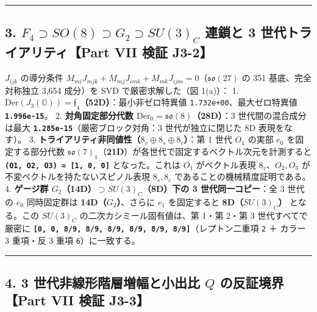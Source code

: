 \documentclass[
  a4paper,
]{ltjsarticle}
\begin{document}
\begin{center}\rule{0.5\linewidth}{0.5pt}\end{center}

\subsection{\texorpdfstring{3.
\(F_4 \supset SO(8) \supset G_2 \supset SU(3)_C\) 連鎖と 3
世代トライアリティ【Part VII 検証
J3-2】}{3. F\_4 \textbackslash supset SO(8) \textbackslash supset G\_2 \textbackslash supset SU(3)\_C 連鎖と 3 世代トライアリティ【Part VII 検証 J3-2】}}\label{f_4-supset-so8-supset-g_2-supset-su3_c-ux9023ux9396ux3068-3-ux4e16ux4ee3ux30c8ux30e9ux30a4ux30a2ux30eaux30c6ux30a3part-vii-ux691cux8a3c-j3-2}

\(J_{ijk}\) の導分条件
\(M_{mi} J_{mjk} + M_{mj} J_{imk} + M_{mk} J_{ijm} = 0\)（\(\mathfrak{so}(27)\)
の 351 基底、完全対称独立 3,654 成分）を SVD で厳密求解した（図 1(a)）：
1.
\textbf{\(\mathrm{Der}(J_3(\mathbb{O})) = \mathfrak{f}_4\)（52D）}：最小非ゼロ特異値
\texttt{1.732e+00}、最大ゼロ特異値 \textbf{\texttt{1.996e-15}}。 2.
\textbf{対角固定部分代数
\(\mathrm{Der}_0 = \mathfrak{so}(8)\)（28D）}：3 世代間の混合成分は最大
\textbf{\texttt{1.285e-15}}（厳密ブロック対角：3 世代が独立に閉じた 8D
表現をなす）。 3.
\textbf{トライアリティ非同値性（\(8_v \oplus 8_s \oplus 8_c\)）}：第 1
世代 \(O_1\) の実部 \(e_0\) を固定する部分代数
\(\mathfrak{so}(7)_1\)（\textbf{21D}）が各世代で固定するベクトル次元を計測すると
\textbf{\texttt{(O1,\ O2,\ O3)\ =\ {[}1,\ 0,\ 0{]}}} となった。これは
\(O_1\) がベクトル表現 \(8_v\)、\(O_2, O_3\)
が不変ベクトルを持たないスピノル表現 \(8_s, 8_c\)
であることの機械精度証明である。 4. \textbf{ゲージ群
\(G_2\)（14D）\(\supset SU(3)_C\)（8D）下の 3 世代同一コピー}：全 3
世代の \(e_0\) 同時固定群は \textbf{14D（\(G_2\)）}、さらに \(e_1\)
を固定すると \textbf{8D（\(SU(3)_C\)）} となる。この \(SU(3)_C\)
の二次カシミール固有値は、第 1・第 2・第 3 世代すべてで厳密に
\textbf{\texttt{{[}0,\ 0,\ 8/9,\ 8/9,\ 8/9,\ 8/9,\ 8/9,\ 8/9{]}}}（レプトン二重項
\texttt{2} ＋ カラー 3 重項・反 3 重項 \texttt{6}）に一致する。

\begin{center}\rule{0.5\linewidth}{0.5pt}\end{center}

\subsection{\texorpdfstring{4. 3 世代非線形階層増幅と小出比 \(Q\)
の反証境界【Part VII 検証
J3-3】}{4. 3 世代非線形階層増幅と小出比 Q の反証境界【Part VII 検証 J3-3】}}\label{ux4e16ux4ee3ux975eux7ddaux5f62ux968eux5c64ux5897ux5e45ux3068ux5c0fux51faux6bd4-q-ux306eux53cdux8a3cux5883ux754cpart-vii-ux691cux8a3c-j3-3}
\end{document}
